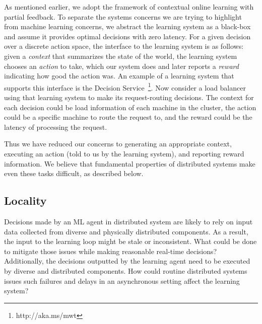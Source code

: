 \documentclass[a4paper,twocolumn]{article}
\begin{document}
As mentioned earlier, we adopt the framework of contextual online learning with
partial feedback.  To separate the systems concerns we are trying to highlight
from machine learning concerns, we abstract the learning system as a black-box
and assume it provides optimal decisions with zero latency. For a given decision
over a discrete action space, the interface to the learning system is as
follows: given a {\em context} that summarizes the state of the world, the
learning system chooses an {\em action} to take, which our system does and later
reports a {\em reward} indicating how good the action was. An example of a
learning system that supports this interface is the Decision
Service~\footnote{http://aka.ms/mwt}. Now consider a load balancer using that
learning system to make its request-routing decisions. The context for each
decision could be load information of each machine in the cluster, the action
could be a specific machine to route the request to, and the reward could be the
latency of processing the request.

Thus we have reduced our concerns to generating an appropriate context,
executing an action (told to us by the learning system), and reporting reward
information.  We believe that fundamental properties of distributed systems make
even these tasks difficult, as described below.

\subsection*{Locality}

Decisions made by an ML agent in distributed system are likely to rely on input
data collected from diverse and physically distributed components. As a result,
the input to the learning loop might be stale or inconsistent. What could be
done to mitigate those issues while making reasonable real-time decisions?
Additionally, the decisions outputted by the learning agent need to be executed
by diverse and distributed components. How could routine distributed systems
issues such failures and delays in an asynchronous setting affect the learning
system?
\end{document}
